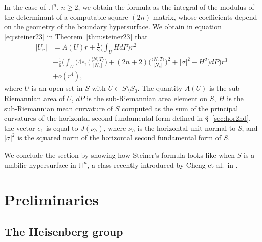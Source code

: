 \documentclass[10pt]{amsart}
\theoremstyle{definition}
\theoremstyle{remark}
\numberwithin{equation}{section}
\begin{document}
In the case of ${{\mathbb{H}}}^n$, $n{\geqslant} 2$, we obtain the formula as the integral of the modulus of the determinant of a computable square $(2n)$ matrix, whose coefficients depend on the geometry of the boundary hypersurface. We obtain in equation \eqref{eq:steiner23} in Theorem~\ref{thm:steiner23} that
\begin{equation*}
\begin{split}
|U_r|&=A(U)r+\frac{1}{2}\bigg(\int_U HdP\bigg)r^2
\\
&-\frac{1}{6}\bigg(\int_U\bigg(4e_1\bigg({\frac{{\langle{N,T}\rangle}}{|N_h|}}\bigg)+(2n+2)\bigg({\frac{{\langle{N,T}\rangle}}{|N_h|}}\bigg)^2+|{\sigma}|^2-H^2\bigg)dP\bigg)r^3
\\
&+o(r^4),
\end{split}
\end{equation*}
where $U$ is an open set in $S$ with $\overline{U}\subset S\setminus S_0$. The quantity $A(U)$ is the sub-Riemannian area of $U$, $dP$ is the sub-Riemannian area element on $S$, $H$ is the sub-Riemannian mean curvature of $S$ computed as the sum of the principal curvatures of the horizontal second fundamental form defined in \S~\ref{sec:hor2nd}, the vector $e_1$ is equal to $J({\nu_{h}})$, where ${\nu_{h}}$ is the horizontal unit normal to $S$, and $|{\sigma}|^2$ is the squared norm of the horizontal second fundamental form of $S$.

We conclude the section by showing how Steiner's formula looks like when $S$ is a umbilic hypersurface in ${{\mathbb{H}}}^n$, a class recently introduced by Cheng et al.~in \cite{cchy}.

\section{Preliminaries}
\label{sec:preliminaries}

\subsection{The Heisenberg group}
\end{document}
